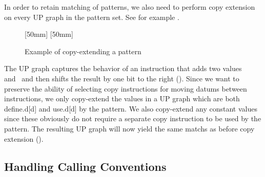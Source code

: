 In order to retain matching of \glspl{pattern}, we also need to perform
\gls{copy extension} on every \gls{UP graph} in the \gls{pattern set}.
%
See for example .
%
\begin{figure}
  \setlength{\nodeDist}{12pt}%

  \mbox{}%
  \hfill%
                [50mm]%
                {%
                }%
  \hfill%
                [50mm]%
                {%
                }%
  \hfill%
  \mbox{}

  \caption{Example of copy-extending a pattern}
\end{figure}
%
The \gls{UP graph} captures the behavior of an \gls{instruction} that adds two
values~ and~ and then shifts the result by one bit to the
right ().
%
Since we want to preserve the ability of selecting copy \glspl{instruction} for
moving \glspl{datum} between \glspl{instruction}, we only copy-extend the values
in a \gls{UP graph} which are both \gls{define.d}[d] and \gls{use.d}[d] by the
\gls{pattern}.
%
We also copy-extend any constant values since these obviously do not require a
separate copy \gls{instruction} to be used by the \gls{pattern}.
%
The resulting \gls{UP graph} will now yield the same \glspl{match} as before
\gls{copy extension} ().


\subsection{Handling Calling Conventions}

